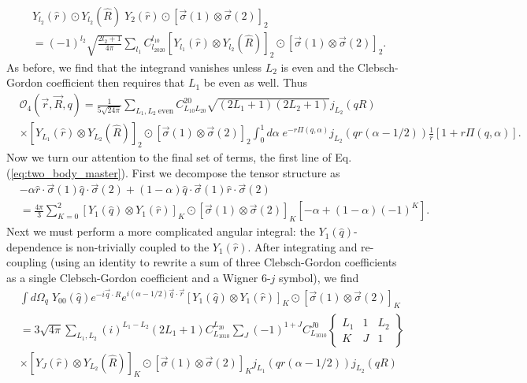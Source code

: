 \documentclass[12pt,letterpaper]{book}
\begin{document}
\begin{equation}
\begin{split}
&Y_{l_2}(\hat{r})\odot Y_{l_2}(\hat{R})\;Y_2(\hat{r})\odot\left[\vec{\sigma}(1)\otimes\vec{\sigma}(2)\right]_2\\
&=(-1)^{l_2}\sqrt{\frac{2l_2+1}{4\pi}}\sum_{l_1}C_{l_2020}^{l_10}\left[Y_{l_1}(\hat{r})\otimes Y_{l_2}(\hat{R})\right]_2\odot\left[\vec{\sigma}(1)\otimes\vec{\sigma}(2)\right]_2.
\end{split}
\end{equation}
As before, we find that the integrand vanishes unless $L_2$ is even and the Clebsch-Gordon coefficient then requires that $L_1$ be even as well. Thus
\begin{equation}
\begin{split}
&\mathcal{O}_4(\vec{r},\vec{R},q) = \frac{1}{5\sqrt{24\pi}}\sum_{L_1,L_2\;\mathrm{even}}C_{L_10L_20}^{20}\sqrt{(2L_1+1)(2L_2+1)}j_{L_2}(q R)\\
&\times\left[Y_{L_1}(\hat{r})\otimes Y_{L_2}(\hat{R})\right]_2\odot\left[\vec{\sigma}(1)\otimes\vec{\sigma}(2)\right]_2\int_0^1 d\alpha\;e^{-r\Pi(q,\alpha)}j_{L_2}(q r(\alpha-1/2))\frac{1}{r}\left[1+r\Pi(q,\alpha)\right].
\end{split}
\end{equation}
Now we turn our attention to the final set of terms, the first line of Eq. (\ref{eq:two_body_master}). First we decompose the tensor structure as
\begin{equation}
\begin{split}
&-\alpha \hat{r}\cdot\vec{\sigma}(1)\hat{q}\cdot\vec{\sigma}(2)+(1-\alpha)\hat{q}\cdot\vec{\sigma}(1)\hat{r}\cdot\vec{\sigma}(2)\\
&=\frac{4\pi}{3}\sum_{K=0}^2\left[Y_1(\hat{q})\otimes Y_1(\hat{r})\right]_K\odot\left[\vec{\sigma}(1)\otimes\vec{\sigma}(2)\right]_K\left[-\alpha + (1-\alpha)(-1)^K\right].
\end{split}
\end{equation}
Next we must perform a more complicated angular integral: the $Y_1(\hat{q})$-dependence is non-trivially coupled to the $Y_1(\hat{r})$. After integrating and re-coupling (using an identity to rewrite a sum of three Clebsch-Gordon coefficients as a single Clebsch-Gordon coefficient and a Wigner 6-$j$ symbol), we find
\begin{equation}
\begin{split}
&\int d\Omega_q\;Y_{00}(\hat{q})e^{-i\vec{q}\cdot{R}}e^{i(\alpha-1/2)\vec{q}\cdot\vec{r}}\left[Y_1(\hat{q})\otimes Y_1(\hat{r})\right]_K\odot\left[\vec{\sigma}(1)\otimes\vec{\sigma}(2)\right]_K\\
&=3\sqrt{4\pi}\sum_{L_1,L_2}(i)^{L_1-L_2}(2L_1+1)C_{L_1010}^{L_20}\sum_J (-1)^{1+J}C_{L_1010}^{J0}\left\{
\begin{array}{ccc}
L_1 & 1 & L_2\\
K & J & 1
\end{array}\right\}
\\ &\times\left[Y_J(\hat{r})\otimes Y_{L_2}(\hat{R})\right]_K\odot\left[\vec{\sigma}(1)\otimes\vec{\sigma}(2)\right]_Kj_{L_1}(q r(\alpha-1/2))j_{L_2}(q R)
\end{split}
\end{equation}
\end{document}
